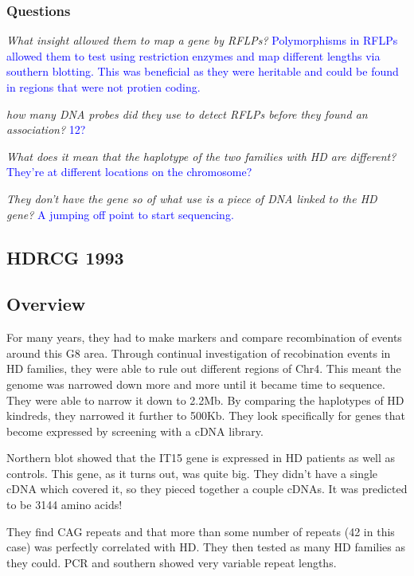 \documentclass[12pt]{report}
\begin{document}
\subsubsection{Questions}

\textit{What insight allowed them to map a gene by RFLPs?} \textcolor{blue}{Polymorphisms in RFLPs allowed them to test using restriction enzymes and map different lengths via southern blotting. This was beneficial as they were heritable and could be found in regions that were not protien coding.}

\textit{how many DNA probes did they use to detect RFLPs before they found an association?} \textcolor{blue}{12?}

\textit{What does it mean that the haplotype of the two families with HD are different?} \textcolor{blue}{They're at different locations on the chromosome?}

\textit{They don't have the gene so of what use is a piece of DNA linked to the HD gene?} \textcolor{blue}{A jumping off point to start sequencing.}

\subsection{HDRCG 1993}


\subsection{Overview}

For many years, they had to make markers and compare recombination of events around this G8 area. Through continual investigation of recobination events in HD families, they were able to rule out different regions of Chr4. This meant the genome was narrowed down more and more until it became time to sequence. They were able to narrow it down to 2.2Mb. By comparing the haplotypes of HD kindreds, they narrowed it further to 500Kb. They look specifically for genes that become expressed by screening with a cDNA library. \newline

Northern blot showed that the IT15 gene is expressed in HD patients as well as controls. This gene, as it turns out, was quite big. They didn't have a single cDNA which covered it, so they pieced together a couple cDNAs. It was predicted to be 3144 amino acids!\newline

They find CAG repeats and that more than some number of repeats (42 in this case) was perfectly correlated with HD. They then tested as many HD families as they could. PCR and southern showed very variable repeat lengths. 
\end{document}
